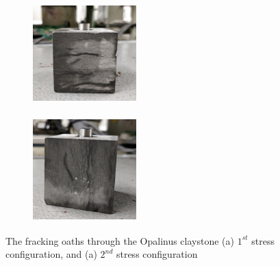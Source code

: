 \begin{figure}[!ht]
\begin{subfigure}[c]{0.48\textwidth}
\centering
\includegraphics[width=4cm,height=4cm]{figures/Amir_Percolation_Frack_a.png}
\subcaption{}
\label{fig:Amir_Percolation_Frack_a}
\end{subfigure}
\hfill
\begin{subfigure}[c]{0.48\textwidth}
\centering
\includegraphics[width=4cm,height=4cm]{figures/Amir_Percolation_Frack_b.png}
\subcaption{}
\label{fig:Amir_Percolation_Frack_b}
\end{subfigure}
\caption{The fracking oaths through the Opalinus claystone (a) $1^{st}$ stress configuration, and (a) $2^{nd}$ stress configuration}
\end{figure}

